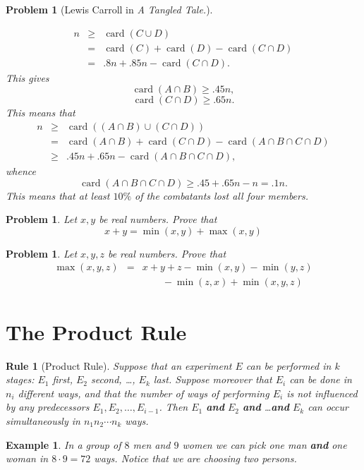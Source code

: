 \documentclass[11pt, openany]{book}
\theoremstyle{change} \theoremheaderfont{\blue\sffamily\bfseries}
\newtheorem{rul}[thm]{Rule}
\newtheorem{exa}[thm]{Example}
\newtheorem{pro}[thm]{Problem}
\theoremstyle{nonumberplain} \theoremheaderfont{\sffamily\bfseries}
\newcommand{\í}{\'{\i}}
\def\card#1{\operatorname{card}\left(#1\right)}
\begin{document}
\begin{multicols}{2}
\begin{pro}[Lewis Carroll in {\em A Tangled Tale.}]
\begin{answer}
$$\begin{array}{lll}n  &\geq & \card{ C \cup D} \\ & = & \card{ C} + \card{ D} - \card{ C \cap D} \\ & = & .8n + .85n - \card{ C\cap
D}. \end{array}$$This gives
$$\card{ A \cap B} \geq .45n,$$
$$\card{ C \cap D} \geq .65n.$$This means that
$$\begin{array}{lll}n &\geq & \card{ (A\cap B) \cup (C \cap D)} \\ & = & \card{ A \cap B} + \card{ C \cap D} - \card{ A \cap B \cap C \cap D}\\
& \geq &  .45n + .65n - \card{ A \cap B \cap C \cap D},\end{array}$$
whence
$$\card{ A \cap B \cap C \cap D} \geq .45 + .65n - n = .1n.$$This means
that at least $10\%$ of the combatants lost all four members.
\end{answer}
\end{pro}

\begin{pro}
Let $x, y$ be real numbers. Prove that
$$
x + y = \min (x, y) + \max (x, y)
$$
\end{pro}
\begin{pro}
Let $x, y , z$ be real numbers. Prove that
$$ \begin{array}{lll}
\max (x, y, z)  & = &  x + y + z - \min (x, y) - \min (y, z)\\ & &
\qquad  - \min (z, x) + \min (x, y , z) \end{array}$$
\end{pro}

\end{multicols}
\section{The Product Rule}
 \begin{rul}[Product Rule] Suppose that an experiment $E$ can be performed in $k$ stages: $E_1$ first, $E_2$ second,
 \ldots, $E_k$ last.  Suppose moreover that $E_i$ can be done in $n_i$ different
ways, and that the number of ways of performing $E_i$ is not
influenced by any predecessors $E_1, E_2, \ldots , E_{i - 1}$. Then
$E_1$ {\bf and} $E_2$ {\bf and} \ldots {\bf and} $E_k$  can occur
simultaneously in $n_1n_2\cdots n_k$ ways.
\end{rul}
\begin{exa}
In a group of $8$ men and $9$ women we can pick one man {\bf and}
one woman in $8\cdot 9 = 72$ ways. Notice that we are choosing two
persons.
\end{exa}
\end{document}
